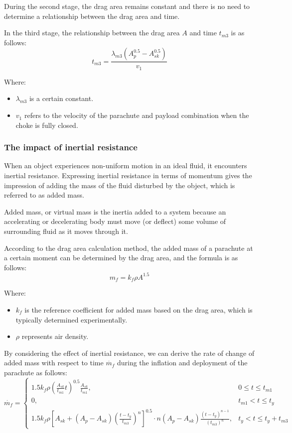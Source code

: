 \documentclass[12pt]{article}
\begin{document}
During the second stage, the drag area remains constant and there is no 
need to determine a relationship between the drag area and time.

In the third stage, the relationship between the drag area $A$ and time $t_{m3}$ is as follows:
\[t_{m3} = \frac{\lambda_{m3}\left(A_p^{0.5}-A_{sk}^{0.5}\right)}{v_1}\]

Where:
\begin{itemize}
    \item $\lambda_{m3}$ is a certain constant.
    \item $v_1$ refers to the velocity of the parachute and payload combination when the choke is fully closed.
\end{itemize}

\subsubsection{The impact of inertial resistance}
When an object experiences non-uniform motion in an ideal fluid, it encounters inertial resistance. 
Expressing inertial resistance in terms of momentum gives the impression of adding the mass of the 
fluid disturbed by the object, which is referred to as added mass.

Added mass, or virtual mass is the inertia added to a system because an accelerating or decelerating 
body must move (or deflect) some volume of surrounding fluid as it moves through it\cite{enwiki:1168352876}.

According to the drag area calculation method, the added mass of a parachute at a certain moment 
can be determined by the drag area, and the formula is as follows\cite{jia2023parachute}:
\[m_f = k_f \rho A^{1.5}\]

Where:
\begin{itemize}
    \item $k_f$ is the reference coefficient for added mass based on the drag area, which is typically determined experimentally.
    \item $\rho$ represents air density.
\end{itemize}

By considering the effect of inertial resistance, we can derive the 
rate of change of added mass with respect to time $\dot{m_f}$
during the inflation and deployment of the parachute as follows\cite{jia2023parachute}:
\[
\dot{m_f} = 
\begin{cases}
    1.5k_f\rho \left(\frac{A_{sk}}{t_{m1}}t\right)^{0.5}\frac{A_{sk}}{t_{m1}}, &  0 \leqslant t \leqslant t_{m1}\\
    0, & t_{m1} < t \leqslant t_y\\
    1.5k_f\rho \left[A_{sk}+(A_p-A_{sk})\left(\frac{t - t_y}{t_{m3}}\right)^n\right]^{0.5} \cdot n(A_p - A_{sk})\frac{(t-t_y)^{n-1}}{(t_{m3})^n}, & t_y < t \leqslant t_y + t_{m3}
\end{cases}
\]
\end{document}
